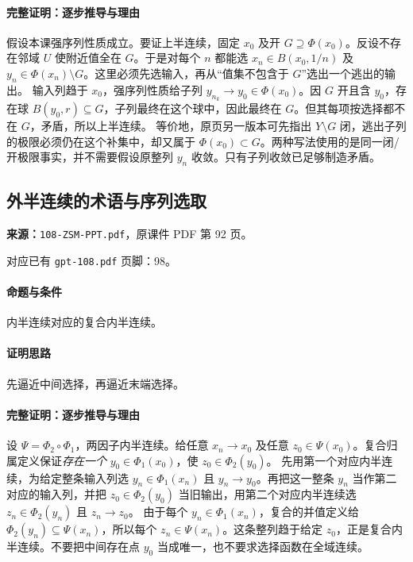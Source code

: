 \paragraph{完整证明：逐步推导与理由}

假设本课强序列性质成立。要证上半连续，固定 $x_0$ 及开 $G\supseteq\Phi(x_0)$。反设不存在邻域 $U$ 使附近值全在 $G$。于是对每个 $n$ 都能选 $x_n\in B(x_0,1/n)$ 及 $y_n\in\Phi(x_n)\setminus G$。这里必须先选输入，再从“值集不包含于 $G$”选出一个逃出的输出。
输入列趋于 $x_0$，强序列性质给子列 $y_{n_k}\to y_0\in\Phi(x_0)$。因 $G$ 开且含 $y_0$，存在球 $B(y_0,r)\subseteq G$，子列最终在这个球中，因此最终在 $G$。但其每项按选择都不在 $G$，矛盾，所以上半连续。
等价地，原页另一版本可先指出 $Y\setminus G$ 闭，逃出子列的极限必须仍在这个补集中，却又属于 $\Phi(x_0)\subset G$。两种写法使用的是同一闭/开极限事实，并不需要假设原整列 $y_n$ 收敛。只有子列收敛已足够制造矛盾。

\clearpage\subsection{外半连续的术语与序列选取}
\textbf{来源：}\texttt{108-ZSM-PPT.pdf}，原课件 PDF 第 92 页。\par
对应已有 \texttt{gpt-108.pdf} 页脚：98。\par
\paragraph{命题与条件}内半连续对应的复合内半连续。
\paragraph{证明思路}先逼近中间选择，再逼近末端选择。
\paragraph{完整证明：逐步推导与理由}

设 $\Psi=\Phi_2\circ\Phi_1$，两因子内半连续。给任意 $x_n\to x_0$ 及任意 $z_0\in\Psi(x_0)$。复合归属定义保证\emph{存在一个} $y_0\in\Phi_1(x_0)$，使 $z_0\in\Phi_2(y_0)$。
先用第一个对应内半连续，为给定整条输入列选 $y_n\in\Phi_1(x_n)$ 且 $y_n\to y_0$。再把这一整条 $y_n$ 当作第二对应的输入列，并把 $z_0\in\Phi_2(y_0)$ 当旧输出，用第二个对应内半连续选 $z_n\in\Phi_2(y_n)$ 且 $z_n\to z_0$。
由于每个 $y_n\in\Phi_1(x_n)$，复合的并值定义给 $\Phi_2(y_n)\subseteq\Psi(x_n)$，所以每个 $z_n\in\Psi(x_n)$。这条整列趋于给定 $z_0$，正是复合内半连续。不要把中间存在点 $y_0$ 当成唯一，也不要求选择函数在全域连续。


